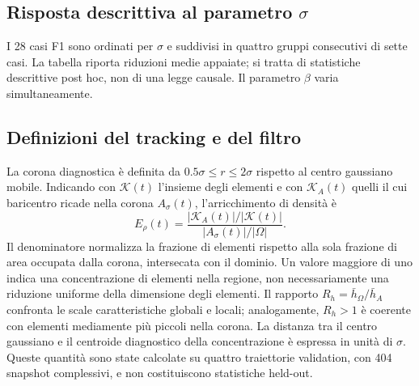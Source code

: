 \subsection{Risposta descrittiva al parametro \texorpdfstring{$\sigma$}{sigma}}

I 28 casi F1 sono ordinati per $\sigma$ e suddivisi in quattro gruppi consecutivi di sette casi. La tabella riporta riduzioni medie appaiate; si tratta di statistiche descrittive post hoc, non di una legge causale. Il parametro $\beta$ varia simultaneamente.
\begin{table}[!t]
\centering\scriptsize
\caption{Riduzione relativa media dell'errore integrato di GDM nei gruppi ordinati per $\sigma$ del test F1.}
\label{tab:f1_sigma_groups}
\end{table}

\subsection{Definizioni del tracking e del filtro}

La corona diagnostica è definita da $0.5\sigma\le r\le2\sigma$ rispetto al centro gaussiano mobile. Indicando con $\mathcal K(t)$ l'insieme degli elementi e con $\mathcal K_A(t)$ quelli il cui baricentro ricade nella corona $A_\sigma(t)$, l'arricchimento di densità è
\begin{equation}
E_\rho(t)=\frac{|\mathcal K_A(t)|/|\mathcal K(t)|}{|A_\sigma(t)|/|\Omega|}.
\label{eq:annular_enrichment}
\end{equation}
Il denominatore normalizza la frazione di elementi rispetto alla sola frazione di area occupata dalla corona, intersecata con il dominio. Un valore maggiore di uno indica una concentrazione di elementi nella regione, non necessariamente una riduzione uniforme della dimensione degli elementi. Il rapporto $R_h=\bar h_\Omega/\bar h_A$ confronta le scale caratteristiche globali e locali; analogamente, $R_h>1$ è coerente con elementi mediamente più piccoli nella corona. La distanza tra il centro gaussiano e il centroide diagnostico della concentrazione è espressa in unità di $\sigma$. Queste quantità sono state calcolate su quattro traiettorie validation, con 404 snapshot complessivi, e non costituiscono statistiche held-out.


